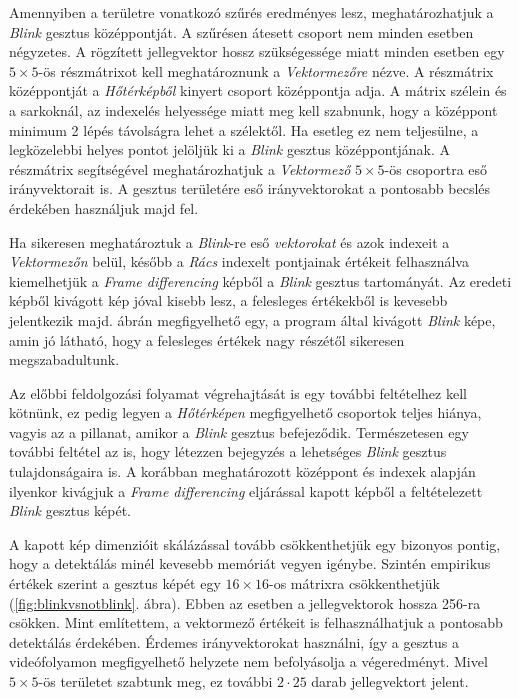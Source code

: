 Amennyiben a területre vonatkozó szűrés eredményes lesz, meghatározhatjuk a \textit{Blink} gesztus középpontját. A szűrésen átesett csoport nem minden esetben négyzetes. A rögzített jellegvektor hossz szükségessége miatt minden esetben egy $5\times5$-ös részmátrixot kell meghatároznunk a \textit{Vektormezőre} nézve. A részmátrix középpontját a \textit{Hőtérképből} kinyert csoport középpontja adja. A mátrix szélein és a sarkoknál, az indexelés helyessége miatt meg kell szabnunk, hogy a középpont minimum 2 lépés távolságra lehet a szélektől. Ha esetleg ez nem teljesülne, a legközelebbi helyes pontot jelöljük ki a \textit{Blink} gesztus középpontjának. A részmátrix segítségével meghatározhatjuk a \textit{Vektormező} $5\times5$-ös csoportra eső irányvektorait is. A gesztus területére eső irányvektorokat a pontosabb becslés érdekében használjuk majd fel.

Ha sikeresen meghatároztuk a \textit{Blink}-re eső \textit{vektorokat} és azok indexeit a \textit{Vektormezőn} belül, később a \textit{Rács} indexelt pontjainak értékeit felhasználva kiemelhetjük a \textit{Frame differencing} képből a \textit{Blink} gesztus tartományát. Az eredeti képből kivágott kép jóval kisebb lesz, a felesleges értékekből is kevesebb jelentkezik majd.  ábrán megfigyelhető egy, a program által kivágott \textit{Blink} képe, amin jó látható, hogy a felesleges értékek nagy részétől sikeresen megszabadultunk.

Az előbbi feldolgozási folyamat végrehajtását is egy további feltételhez kell kötnünk, ez pedig legyen a \textit{Hőtérképen} megfigyelhető csoportok teljes hiánya, vagyis az a pillanat, amikor a \textit{Blink} gesztus befejeződik. Természetesen egy további feltétel az is, hogy létezzen bejegyzés a lehetséges \textit{Blink} gesztus tulajdonságaira is. A korábban meghatározott középpont és indexek alapján ilyenkor kivágjuk a \textit{Frame differencing} eljárással kapott képből a feltételezett \textit{Blink} gesztus képét.

A kapott kép dimenzióit skálázással tovább csökkenthetjük egy bizonyos pontig, hogy a detektálás minél kevesebb memóriát vegyen igénybe. Szintén empirikus értékek szerint a gesztus képét egy $16\times16$-os mátrixra csökkenthetjük (\ref{fig:blinkvsnotblink}. ábra). Ebben az esetben a jellegvektorok hossza 256-ra csökken. Mint említettem, a vektormező értékeit is felhasználhatjuk a pontosabb detektálás érdekében. Érdemes irányvektorokat használni, így a gesztus a videófolyamon megfigyelhető helyzete nem befolyásolja a végeredményt. Mivel $5\times5$-ös területet szabtunk meg, ez további $2\cdot 25$ darab jellegvektort jelent.


